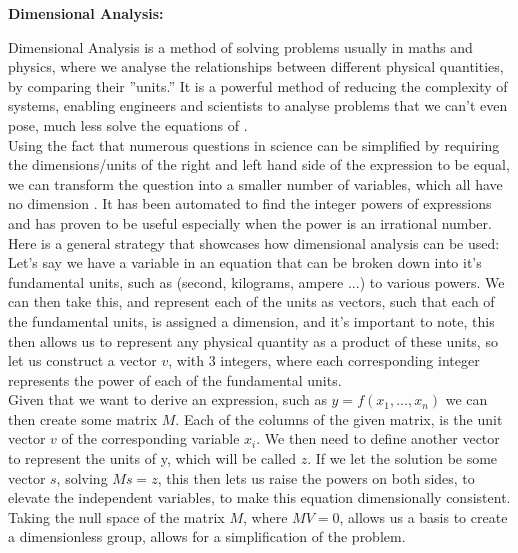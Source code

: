 \documentclass{article}
\begin{document}
\begin{center} 
  \textbf {\Large Dimensional Analysis:}
\end{center}

Dimensional Analysis is a method of solving problems usually in maths and physics, where we analyse
the relationships between different physical quantities, by comparing their ”units.” It is a powerful
method of reducing the complexity of systems, enabling engineers and scientists to analyse problems
that we can’t even pose, much less solve the equations of \cite{Longo2021}.\\

Using the fact that numerous questions in science can be simplified by requiring the dimensions/units
of the right and left hand side of the expression to be equal, we can transform the question into
a smaller number of variables, which all have no dimension \cite{Blasiak2012}. It has been automated to find the integer powers of expressions and has proven to be useful especially when the power is an irrational number.\\

Here is a general strategy that showcases how dimensional analysis can be used:\\

Let's say we have a variable in an equation that can be broken down into it's fundamental units, such as (second, kilograms, ampere ...) to various powers. We can then take this, and represent each of the units as vectors, such that each of the fundamental units, is assigned a dimension, and it's important to note, this then allows us to represent any physical quantity as a product of these units, so let us construct a vector $v$, with $3$ integers, where each corresponding integer represents the power of each of the fundamental units.\\ 

Given that we want to derive an expression, such as $y = f(x_1, \dots, x_n)$  we can then create some matrix $M$. Each of the columns of the given matrix, is the unit vector $v$ of the corresponding variable $x_i$. We then need to define another vector to represent the units of y, which will be called $z$. If we let the solution be some vector $s$, solving $Ms = z$, this then lets us raise the powers on both sides, to elevate the independent variables, to make this equation dimensionally consistent.\\ 

Taking the null space of the matrix $M$, where $MV = 0$, allows us a basis to create a dimensionless group, allows for a simplification of the problem.\\
\end{document}
